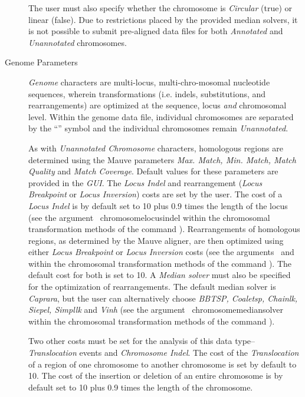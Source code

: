 \begin{description}
		\indent The user must also specify whether the chromosome is \emph{Circular} (true) or linear (false).
		Due to restrictions placed by the provided median solvers, it is not possible to submit pre-aligned 
		data files for both \emph{Annotated} and \emph{Unannotated} chromosomes. 
		
		
	\item [Genome Parameters] \emph{Genome} characters are multi-locus, multi-chro-mosomal nucleotide 
		sequences, wherein transformations (i.e. indels, substitutions, and rearrangements) are optimized 
		at the sequence, locus \emph{and} chromosomal level.  Within the genome data file, individual 
		chromosomes are separated by the  ``\atsymbol'' symbol and the individual chromosomes remain 
		\emph{Unannotated}. 
		
		\indent As with \emph{Unannotated Chromosome} characters, homologous regions are determined 
		using the Mauve parameters \emph{Max. Match, Min. Match, Match Quality} and 
		\emph {Match Coverage}. Default values for these parameters are provided in the \emph{GUI}.
		The \emph{Locus Indel} and rearrangement (\emph{Locus Breakpoint} or \emph{Locus Inversion}) 
		costs are set by the user. The cost of a \emph{Locus Indel} is by default set to 10 plus 0.9 times 
		the length of the locus (see the argument~ {chromosomelocusindel}  
		within the 	chromosomal transformation methods of the command ). 
		Rearrangements of homologous regions, as determined  by the Mauve aligner, are then 
		optimized using either \emph{Locus Breakpoint} or \emph{Locus Inversion} costs 
		(see the arguments~ 
		and~ within the chromosomal 
		transformation methods of the command ). 
		The default cost for both is set to 10. A \emph{Median solver} must also be specified for the 
		optimization of rearrangements. The default median solver is \emph{Caprara}, 
		but the user can alternatively choose \emph{BBTSP, Coaletsp, 
		Chainlk, Siepel, Simpllk} and \emph{Vinh} (see the argument~
		{chromosomemediansolver} within the chromosomal transformation methods of the command 
		).
		
		\indent Two other costs must be set for the analysis of this data type--\emph{Translocation} 
		events and \emph{Chromosome Indel}. The cost of the \emph{Translocation} of a region of one 
		chromosome to another chromosome is set by default to 10.  The cost of the insertion or deletion
		of an entire chromosome is by default set to 10 plus 0.9 times the length of the chromosome.
				

\end{description}
